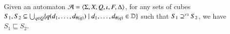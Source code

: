 \documentclass{llncs}
\begin{document}
\begin{lemma}\label{lemma:coverage}
  Given an automaton $\mathcal{A} = \langle \Sigma,X,Q,\iota,F,\Delta \rangle$, for any
  sets of cubes $S_1, S_2 \subseteq \bigcup_{q \in Q}
  \{ q(d_1,\ldots,d_{\#(q)}) \mid d_1,\ldots,d_{\#(q)} \in \mathbb{D} \}$
  such that $S_1 \supseteq^{\scriptscriptstyle\forall\exists} S_2$, we have $S_1 \sqsubseteq S_2$.
\end{lemma}
\proof{  
\qed}

 

\end{document}
